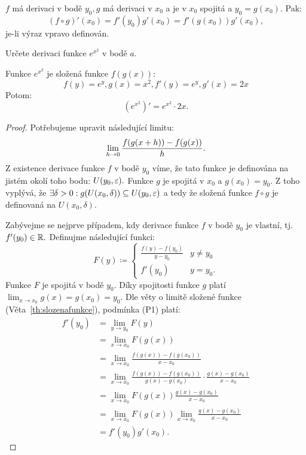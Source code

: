 \begin{theorem}
    \Necht $f$ má derivaci v bodě $y_0, g$ má derivaci v $x_0$ a je v $x_0$ spojitá
    a $y_0 = g(x_0).$ Pak:
    $$(f \circ g)'(x_0) = f'(y_0)g'(x_0) = f'(g(x_0))g'(x_0),$$
    je-li výraz vpravo definován.
\end{theorem}

\begin{example}
    Určete derivaci funkce $e^{x^2}$ v bodě $a$.

    Funkce $e^{x^2}$ je složená funkce $f(g(x)):$
    $$f(y) = e^y, g(x) = x^2, f'(y) = e^y, g'(x) = 2x$$
    Potom:
    $$(e^{x^2})' = e^{x^2} \cdot 2x.$$
\end{example}

\begin{proof}
    Potřebujeme upravit následující limitu:
    $$\lim_{h \to 0} \frac{f(g(x+h)) - f(g(x))}{h}.$$
    Z existence derivace funkce $f$ v bodě $y_0$ víme, že tato funkce je 
    definována na jistém okolí toho bodu: $U(y_0, \varepsilon).$ Funkce $g$ je spojitá
    v $x_0$ a $g(x_0) = y_0.$ Z toho vyplývá, že $\exists \delta >0:
    g(U(x_0, \delta)) \subseteq U(y_0, \varepsilon)$ a tedy že složená funkce
    $f \circ g$ je definovaná na $U(x_0, \delta).$
    
    Zabývejme se nejprve případem, kdy derivace funkce $f$ v bodě $y_0$ je vlastní,
    tj. $f'(y_0) \in \mathbb{R}.$ Definujme následující funkci:
    $$F(y) \coloneqq 
        \begin{cases}
            \frac{f(y) - f(y_0)}{y-y_0} &y \neq y_0 \\
            f'(y_0) &y=y_0.
        \end{cases}
    $$
    Funkce $F$ je spojitá v bodě $y_0.$ Díky spojitosti funkce $g$ platí 
    $\lim_{x \to x_0} g(x) = g(x_0) = y_0.$ Dle věty o limitě 
    složené funkce (Věta~\ref{th:slozenafunkce}), podmínka (P1) platí:
    \begin{align*}
        f'(y_0) &= \lim_{y \to y_0} F(y) \\
                &= \lim_{x \to x_0} F(g(x)) \\
                &= \lim_{x \to x_0} \frac{f(g(x)) - f(g(x_0))}{x-x_0} \\
                &= \lim_{x \to x_0} \frac{f(g(x)) - f(g(x_0))}{g(x)-g(x_0)} \cdot \frac{g(x) - g(x_0)}{x-x_0} \\
                &= \lim_{x\to x_0} F(g(x)) \frac{g(x) - g(x_0)}{x-x_0} \\
                &= \lim_{x\to x_0} F(g(x)) \lim_{x \to x_0} \frac{g(x)-g(x_0)}{x-x_0} \\
                &= f'(y_0)g'(x_0).
    \end{align*}


\end{proof}
